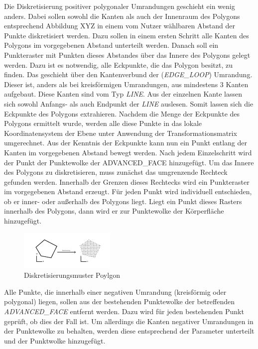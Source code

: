 Die Diskretisierung positiver polygonaler Umrandungen geschieht ein wenig anders. Dabei sollen sowohl die Kanten als auch der Innenraum des Polygons entsprechend Abbildung XYZ in einem vom Nutzer wählbaren Abstand der Punkte  diskretisiert werden. Dazu sollen in einem ersten Schritt alle Kanten des Polygons im vorgegebenen Abstand unterteilt werden. Danach soll ein Punkteraster mit Punkten dieses Abstandes über das Innere des Polygons gelegt werden. Dazu ist es notwendig, alle Eckpunkte, die das Polygon besitzt, zu finden. Das geschieht über den Kantenverbund der (\textit{EDGE\_LOOP}) Umrandung. Dieser ist, anders als bei kreisförmigen Umrandungen, aus mindestens 3 Kanten aufgebaut. Diese Kanten sind vom Typ \textit{LINE}. Aus der einzelnen Kante lassen sich sowohl Anfangs- als auch Endpunkt der \textit{LINE} auslesen. Somit lassen sich die Eckpunkte des Polygons extrahieren. Nachdem die Menge der Eckpunkte des Polygons ermittelt wurde, werden alle diese Punkte in das lokale Koordinatensystem der Ebene unter Anwendung der Transformationsmatrix umgerechnet.
Aus der Kenntnis der Eckpunkte kann nun ein Punkt entlang der Kanten im vorgegebenen Abstand bewegt werden. Nach jedem Einzelschritt wird der Punkt der Punktewolke der ADVANCED\_FACE hinzugefügt. 
Um das Innere des Polygons zu diskretisieren, muss zunächst das umgrenzende Rechteck gefunden werden. Innerhalb der Grenzen dieses Rechtecks wird ein Punkteraster im vorgegebenen Abstand erzeugt. Für jeden Punkt wird individuell entschieden, ob er inner- oder außerhalb des Polygons liegt. Liegt ein Punkt dieses Rasters innerhalb des Polygons, dann wird er zur Punktewolke der Körperfläche hinzugefügt.  

\begin{figure}[h]
	\centering
	
	\includegraphics[width=0.7\linewidth]{img/discretpolygon.pdf}
	
	\caption{Diskretisierungsmuster Poylgon}
	\label{fig:discretpolygon}
	
\end{figure}

Alle Punkte, die innerhalb einer negativen Umrandung (kreisförmig oder polygonal) liegen, sollen aus der bestehenden Punktewolke der betreffenden \textit{ADVANCED\_FACE} entfernt werden. Dazu wird für jeden bestehenden Punkt geprüft, ob dies der Fall ist. Um allerdings die Kanten negativer Umrandungen in der Punktewolke zu behalten, werden diese entsprechend der Parameter unterteilt und der Punktwolke hinzugefügt.       








